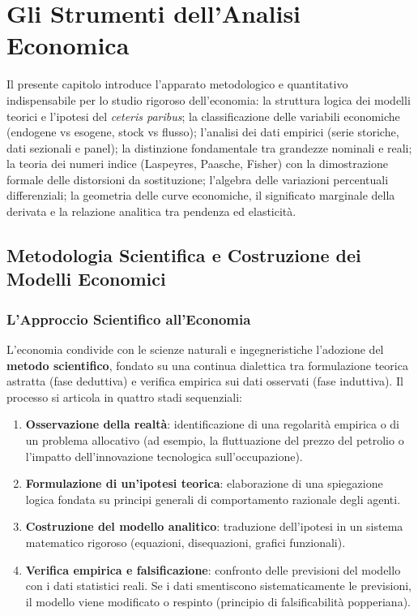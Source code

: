 \chapter{Gli Strumenti dell'Analisi Economica}
\label{chap:strumenti_analisi_economica}

\begin{tcolorbox}[colback=navyblue!5!white, colframe=navyblue, title=\textbf{Quadro Concettuale e Obiettivi Didattici}]
Il presente capitolo introduce l'apparato metodologico e quantitativo indispensabile per lo studio rigoroso dell'economia: la struttura logica dei modelli teorici e l'ipotesi del \textit{ceteris paribus}; la classificazione delle variabili economiche (endogene vs esogene, stock vs flusso); l'analisi dei dati empirici (serie storiche, dati sezionali e panel); la distinzione fondamentale tra grandezze nominali e reali; la teoria dei numeri indice (Laspeyres, Paasche, Fisher) con la dimostrazione formale delle distorsioni da sostituzione; l'algebra delle variazioni percentuali differenziali; la geometria delle curve economiche, il significato marginale della derivata e la relazione analitica tra pendenza ed elasticità.
\end{tcolorbox}

\section{Metodologia Scientifica e Costruzione dei Modelli Economici}

\subsection{L'Approccio Scientifico all'Economia}
L'economia condivide con le scienze naturali e ingegneristiche l'adozione del \textbf{metodo scientifico}, fondato su una continua dialettica tra formulazione teorica astratta (fase deduttiva) e verifica empirica sui dati osservati (fase induttiva). Il processo si articola in quattro stadi sequenziali:
\begin{enumerate}
    \item \textbf{Osservazione della realtà}: identificazione di una regolarità empirica o di un problema allocativo (ad esempio, la fluttuazione del prezzo del petrolio o l'impatto dell'innovazione tecnologica sull'occupazione).
    \item \textbf{Formulazione di un'ipotesi teorica}: elaborazione di una spiegazione logica fondata su principi generali di comportamento razionale degli agenti.
    \item \textbf{Costruzione del modello analitico}: traduzione dell'ipotesi in un sistema matematico rigoroso (equazioni, disequazioni, grafici funzionali).
    \item \textbf{Verifica empirica e falsificazione}: confronto delle previsioni del modello con i dati statistici reali. Se i dati smentiscono sistematicamente le previsioni, il modello viene modificato o respinto (principio di falsificabilità popperiana).
\end{enumerate}

